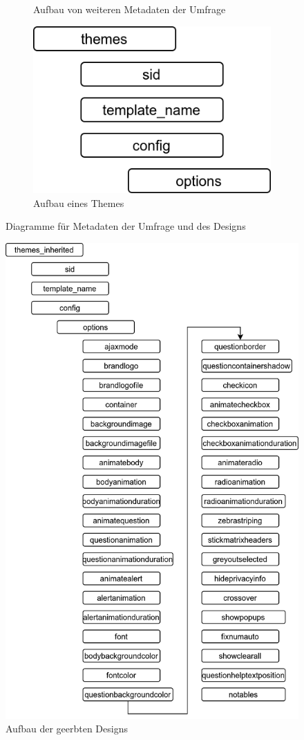 \begin{figure}[h]
{\begin{subfigure}[b]{.45\textwidth}
			\caption{Aufbau von weiteren Metadaten der Umfrage}
		\end{subfigure}%
		\begin{subfigure}[b]{.45\textwidth}
			\includegraphics[width=.8\textwidth]{./img/append_lss_theme.png}
			\caption{Aufbau eines Themes}
		\end{subfigure}%
		}
		\caption{Diagramme für Metadaten der Umfrage und des Designs}
\end{figure}

\begin{figure}[h]
	\centering
	\includegraphics[width=.95\textwidth]{./img/append_lss_theme_inh.png}
	\caption{Aufbau der geerbten Designs}
\end{figure}
